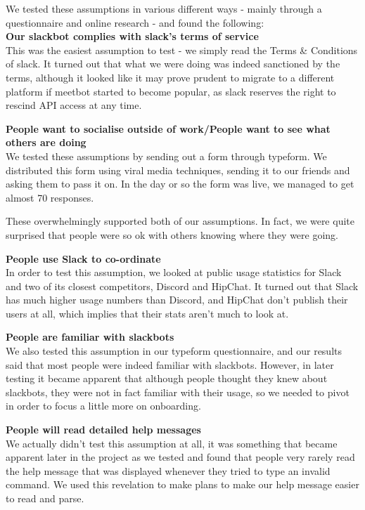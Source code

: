 \documentclass[12pt]{report}
\begin{document}
We tested these assumptions in various different ways - mainly through a questionnaire and online research - and found the following:\\

\textbf{Our slackbot complies with slack's terms of service}\\
This was the easiest assumption to test - we simply read the Terms \& Conditions of slack. It turned out that what we were doing was indeed sanctioned by the terms, although it looked like it may prove prudent to migrate to a different platform if meetbot started to become popular, as slack reserves the right to rescind API access at any time.

\textbf{People want to socialise outside of work/People want to see what others are doing}\\
We tested these assumptions by sending out a form through typeform. We distributed this form using viral media techniques, sending it to our friends and asking them to pass it on. In the day or so the form was live, we managed to get almost 70 responses.

These overwhelmingly supported both of our assumptions. In fact, we were quite surprised that people were so ok with others knowing where they were going.

\textbf{People use Slack to co-ordinate}\\
In order to test this assumption, we looked at public usage statistics for Slack and two of its closest competitors, Discord and HipChat. It turned out that Slack has much higher usage numbers than Discord, and HipChat don't publish their users at all, which implies that their stats aren't much to look at.

\textbf{People are familiar with slackbots}\\
We also tested this assumption in our typeform questionnaire, and our results said that most people were indeed familiar with slackbots. However, in later testing it became apparent that although people thought they knew about slackbots, they were not in fact familiar with their usage, so we needed to pivot in order to focus a little more on onboarding.

\textbf{People will read detailed help messages}\\
We actually didn't test this assumption at all, it was something that became apparent later in the project as we tested and found that people very rarely read the help message that was displayed whenever they tried to type an invalid command. We used this revelation to make plans to make our help message easier to read and parse.
\end{document}
